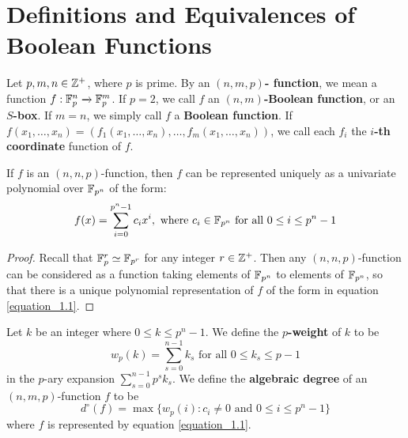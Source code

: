 \section{Definitions and Equivalences of Boolean Functions}\label{section_1.1}

\begin{definition}
  Let $p,m, n \in \mathbb{Z}^+$, where $p$ is prime. By an \textbf{$(n,m,p)$-
  function}, we mean a function $f:\mathbb{F}_p^n \xrightarrow{} \mathbb{F}_p^m$. If
  $p=2$, we call $f$ an \textbf{$(n,m)$-Boolean function}, or an
  \textbf{$S$-box}. If $m=n$, we simply call  $f$ a  \textbf{Boolean
  function}. If  $f(x_1, \dots, x_n)=(f_1(x_1, \dots, x_n), \dots,
  f_m(x_1, \dots, x_n))$, we call each $f_i$ the \textbf{$i$-th
  coordinate} function of $f$.
\end{definition}

\begin{lemma}\label{lemma_1.1.1}
  If $f$ is an  $(n,n,p)$-function, then $f$ can be represented
  uniquely as a univariate polynomial over  $\mathbb{F}_{p^n}$ of the form:
  \begin{equation}\label{equation_1.1}
    f(x)=\sum_{i=0}^{p^n-1}{c_ix^i},  \text{ where } c_i \in \mathbb{F}_{p^n}
    \text{ for all } 0 \leq i \leq p^n-1
  \end{equation}
\end{lemma}
\begin{proof}
  Recall that $\mathbb{F}_p^r \simeq \mathbb{F}_{p^r}$ for any integer $r \in \mathbb{Z}^+$.
  Then any $(n,n,p)$-function can be considered as a function taking
  elements of $\mathbb{F}_{p^n}$ to elements of $\mathbb{F}_{p^n}$, so that there is
  a unique polynomial representation of $f$ of the form in equation
  \ref{equation_1.1}.
\end{proof}

\begin{defintion}
  Let $k$ be an integer where $0 \leq k \leq p^n-1$. We define the
  \textbf{$p$-weight} of $k$ to be
  \begin{equation}\label{equation_1.2}
    w_p(k)=\sum_{s=0}^{n-1}{k_s} \text{ for all } 0 \leq k_s \leq p-1
  \end{equation}
  in the $p$-ary expansion  $\sum_{s=0}^{n-1}{p^sk_s}$. We define the
  \textbf{algebraic degree} of an $(n,m,p)$-function $f$ to be
  \begin{equation}\label{equation_2.3}
    d^\circ(f)=\max{\{w_p(i) : c_i \neq 0 \text{ and } 0 \leq i \leq
    p^n-1\}}
  \end{equation}
  where $f$ is represented by equation \ref{equation_1.1}.
\end{defintion}

